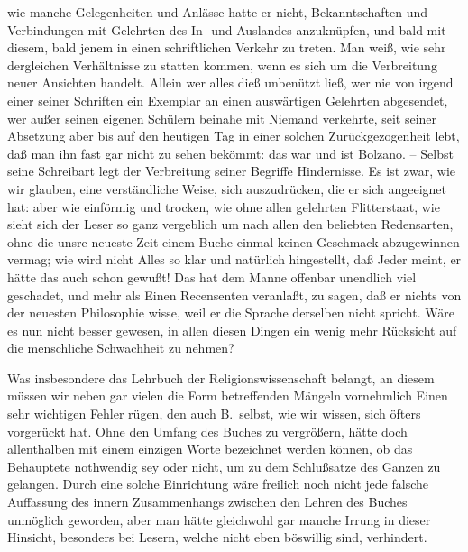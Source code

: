 wie manche Gelegenheiten und Anlässe hatte er nicht, Bekanntschaften und Verbindungen mit Gelehrten des In- und Auslandes anzuknüpfen, und bald mit diesem, bald jenem in einen schriftlichen Verkehr zu treten. Man weiß, wie sehr dergleichen Verhältnisse zu statten kommen, wenn es sich um die Verbreitung neuer Ansichten handelt. Allein wer alles dieß unbenützt ließ, wer nie von irgend einer seiner Schriften ein Exemplar an einen auswärtigen Gelehrten abgesendet, wer außer seinen eigenen Schülern beinahe mit Niemand verkehrte, seit seiner Absetzung aber bis auf den heutigen Tag in einer solchen Zurückgezogenheit lebt, daß man ihn fast gar nicht zu sehen bekömmt: das war und ist Bolzano. -- Selbst seine Schreibart legt der Verbreitung seiner Begriffe Hindernisse. Es ist zwar, wie wir glauben, eine verständliche Weise, sich auszudrücken, die er sich angeeignet hat: aber wie einförmig und trocken, wie ohne allen gelehrten Flitterstaat, wie sieht sich der Leser so ganz vergeblich um nach allen den beliebten Redensarten, ohne die unsre neueste Zeit einem Buche einmal keinen Geschmack abzugewinnen vermag; wie wird nicht Alles so klar und natürlich hingestellt, daß Jeder meint, er hätte das auch schon gewußt! Das hat  dem Manne offenbar unendlich viel geschadet, und mehr als Einen Recensenten veranlaßt, zu sagen, daß er nichts von der neuesten Philosophie wisse, weil er die Sprache derselben nicht spricht. Wäre es nun nicht besser gewesen, in allen diesen Dingen ein wenig mehr Rücksicht auf die menschliche Schwachheit zu nehmen? \par
Was insbesondere das Lehrbuch der Religionswissenschaft belangt, an diesem müssen wir neben gar vielen die Form betreffenden Mängeln vornehmlich Einen sehr wichtigen Fehler rügen, den auch B.\ selbst, wie wir wissen, sich öfters vorgerückt hat. Ohne den Umfang des Buches zu vergrößern, hätte doch allenthalben mit einem einzigen Worte bezeichnet werden können, ob das Behauptete nothwendig sey oder nicht, um zu dem Schlußsatze des Ganzen zu gelangen. Durch eine solche Einrichtung wäre freilich noch nicht jede falsche Auffassung des innern Zusammenhangs zwischen den Lehren des Buches unmöglich geworden, aber man hätte gleichwohl gar manche Irrung in dieser Hinsicht, besonders bei Lesern, welche nicht eben böswillig sind, verhindert. \par

